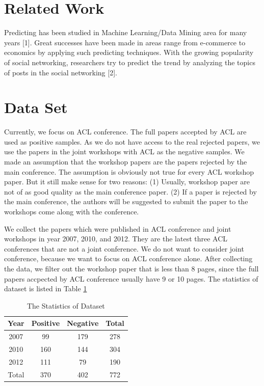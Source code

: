 \documentclass[11pt,letterpaper]{article}
\begin{document}
\section{Related Work}

Predicting has been studied in Machine Learning/Data Mining area for many years [1]. Great successes have been made in areas range from e-commerce to economics by applying such predicting techniques. With the growing popularity of social networking, researchers try to predict the trend by analyzing the topics of posts in the social networking [2]. 



\section{Data Set}
Currently, we focus on ACL conference.
The full papers accepted by ACL are used as positive samples. 
As we do not have access to the real rejected papers, 
we use the papers in the joint workshops with ACL as the negative samples.
We made an assumption that the workshop papers are the papers rejected by the main conference.
The assumption is obviously not true for every ACL workshop paper.
But it still make sense for two reasons:
(1) Usually, workshop paper are not of as good quality as the main conference paper. 
(2) If a paper is rejected by the main conference, the authors will be suggested to submit the paper to the workshops come along with the conference.


We collect the papers which were published in ACL conference and joint workshops in year 2007, 2010, and 2012. 
They are the latest three ACL conferences that are not a joint conference.
We do not want to consider joint conference, because we want to focus on ACL conference alone.
After collecting the data, we filter out the workshop paper that is less than 8 pages, since the full papers accpected by ACL conference usually have 9 or 10 pages.
The statistics of dataset is listed in Table \ref{tab:statistics} 

\begin{table}
\begin{center}
\begin{tabular}{|c|c|c|c|}
\hline 
Year & Positive &	Negative & Total\\ \hline 
2007 & 99  &	179 & 278\\ \hline	
2010 	& 160 &  144 & 304	\\ \hline
2012 	& 111 & 79 & 190 \\ \hline
Total & 370 & 402 & 772 \\\hline	
\end{tabular}
\end{center}
\label{tab:statistics}
\caption{The Statistics of Dataset}
\end{table}
\end{document}
